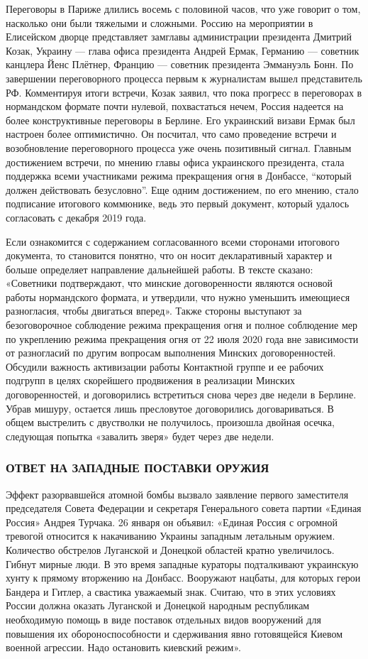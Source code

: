 Переговоры в Париже длились восемь с половиной часов, что уже говорит о том,
насколько они были тяжелыми и сложными. Россию на мероприятии в Елисейском
дворце представляет замглавы администрации президента Дмитрий Козак, Украину —
глава офиса президента Андрей Ермак, Германию — советник канцлера Йенс Плётнер,
Францию — советник президента Эммануэль Бонн. По завершении переговорного
процесса первым к журналистам вышел представитель РФ. Комментируя итоги
встречи, Козак заявил, что пока прогресс в переговорах в нормандском формате
почти нулевой, похвастаться нечем, Россия надеется на более конструктивные
переговоры в Берлине. Его украинский визави Ермак был настроен более
оптимистично. Он посчитал, что само проведение встречи и возобновление
переговорного процесса уже очень позитивный сигнал. Главным достижением
встречи, по мнению главы офиса украинского президента, стала поддержка всеми
участниками режима прекращения огня в Донбассе, \enquote{который должен действовать
безусловно}. Еще одним достижением, по его мнению, стало подписание итогового
коммюнике, ведь это первый документ, который удалось согласовать с декабря 2019
года.

Если ознакомится с содержанием согласованного всеми сторонами итогового
документа, то становится понятно, что он носит декларативный характер и больше
определяет направление дальнейшей работы. В тексте сказано: «Советники
подтверждают, что минские договоренности являются основой работы нормандского
формата, и утвердили, что нужно уменьшить имеющиеся разногласия, чтобы
двигаться вперед». Также стороны выступают за безоговорочное соблюдение режима
прекращения огня и полное соблюдение мер по укреплению режима прекращения огня
от 22 июля 2020 года вне зависимости от разногласий по другим вопросам
выполнения Минских договоренностей. Обсудили важность активизации работы
Контактной группе и ее рабочих подгрупп в целях скорейшего продвижения в
реализации Минских договоренностей, и договорились встретиться снова через две
недели в Берлине. Убрав мишуру, остается лишь пресловутое договорились
договариваться. В общем выстрелить с двустволки не получилось, произошла
двойная осечка, следующая попытка «завалить зверя» будет через две недели.

\subsubsection{ОТВЕТ НА ЗАПАДНЫЕ ПОСТАВКИ ОРУЖИЯ}

Эффект разорвавшейся атомной бомбы вызвало заявление первого заместителя
председателя Совета Федерации и секретаря Генерального совета партии «Единая
Россия» Андрея Турчака. 26 января он объявил: «Единая Россия с огромной
тревогой относится к накачиванию Украины западным летальным оружием. Количество
обстрелов Луганской и Донецкой областей кратно увеличилось. Гибнут мирные люди.
В это время западные кураторы подталкивают украинскую хунту к прямому вторжению
на Донбасс. Вооружают нацбаты, для которых герои Бандера и Гитлер, а свастика
уважаемый знак. Считаю, что в этих условиях России должна оказать Луганской и
Донецкой народным республикам необходимую помощь в виде поставок отдельных
видов вооружений для повышения их обороноспособности и сдерживания явно
готовящейся Киевом военной агрессии. Надо остановить киевский режим».

